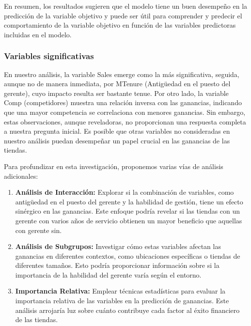 \documentclass[
]{article}
\begin{document}
En resumen, los resultados sugieren que el modelo tiene un buen
desempeño en la predicción de la variable objetivo y puede ser útil para
comprender y predecir el comportamiento de la variable objetivo en
función de las variables predictoras incluidas en el modelo.

\hypertarget{variables-significativas}{%
\subsubsection{Variables
significativas}\label{variables-significativas}}

En nuestro análisis, la variable Sales emerge como la más significativa,
seguida, aunque no de manera inmediata, por MTenure (Antigüedad en el
puesto del gerente), cuyo impacto resulta ser bastante tenue. Por otro
lado, la variable Comp (competidores) muestra una relación inversa con
las ganancias, indicando que una mayor competencia se correlaciona con
menores ganancias. Sin embargo, estas observaciones, aunque reveladoras,
no proporcionan una respuesta completa a nuestra pregunta inicial. Es
posible que otras variables no consideradas en nuestro análisis puedan
desempeñar un papel crucial en las ganancias de las tiendas.

Para profundizar en esta investigación, proponemos varias vías de
análisis adicionales:

\begin{enumerate}
\def\labelenumi{\arabic{enumi}.}
\item
  \textbf{Análisis de Interacción:} Explorar si la combinación de
  variables, como antigüedad en el puesto del gerente y la habilidad de
  gestión, tiene un efecto sinérgico en las ganancias. Este enfoque
  podría revelar si las tiendas con un gerente con varios años de
  servicio obtienen un mayor beneficio que aquellas con gerente sin.
\item
  \textbf{Análisis de Subgrupos:} Investigar cómo estas variables
  afectan las ganancias en diferentes contextos, como ubicaciones
  específicas o tiendas de diferentes tamaños. Esto podría proporcionar
  información sobre si la importancia de la habilidad del gerente varía
  según el entorno.
\item
  \textbf{Importancia Relativa:} Emplear técnicas estadísticas para
  evaluar la importancia relativa de las variables en la predicción de
  ganancias. Este análisis arrojaría luz sobre cuánto contribuye cada
  factor al éxito financiero de las tiendas.
\end{enumerate}
\end{document}
